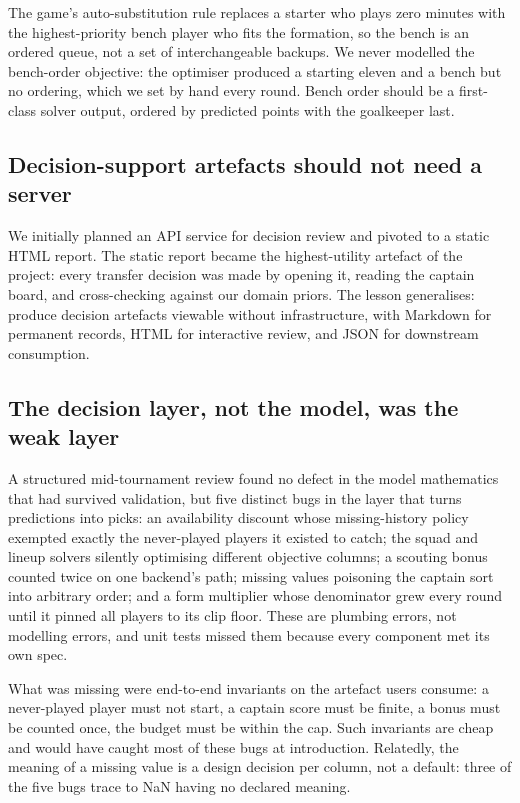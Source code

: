 The game's auto-substitution rule replaces a starter who plays zero
minutes with the highest-priority bench player who fits the formation,
so the bench is an ordered queue, not a set of interchangeable
backups. We never modelled the bench-order objective: the optimiser
produced a starting eleven and a bench but no ordering, which we set
by hand every round. Bench order should be a first-class solver
output, ordered by predicted points with the goalkeeper last.

\subsection{Decision-support artefacts should not need a server}
\label{sec:lessons-artefacts}

We initially planned an API service for decision review and pivoted to
a static HTML report. The static report became the highest-utility
artefact of the project: every transfer decision was made by opening
it, reading the captain board, and cross-checking against our domain
priors. The lesson generalises: produce decision artefacts viewable
without infrastructure, with Markdown for permanent records, HTML for
interactive review, and JSON for downstream consumption.

\subsection{The decision layer, not the model, was the weak layer}
\label{sec:lessons-decision-layer}

A structured mid-tournament review found no defect in the model
mathematics that had survived validation, but five distinct bugs in
the layer that turns predictions into picks: an availability discount
whose missing-history policy exempted exactly the never-played players
it existed to catch; the squad and lineup solvers silently optimising
different objective columns; a scouting bonus counted twice on one
backend's path; missing values poisoning the captain sort into
arbitrary order; and a form multiplier whose denominator grew every
round until it pinned all players to its clip floor. These are
plumbing errors, not modelling errors, and unit tests missed them
because every component met its own spec.

What was missing were end-to-end invariants on the artefact users
consume: a never-played player must not start, a captain score must be
finite, a bonus must be counted once, the budget must be within the
cap. Such invariants are cheap and would have caught most of these
bugs at introduction. Relatedly, the meaning of a missing value is a
design decision per column, not a default: three of the five bugs
trace to NaN having no declared meaning.

